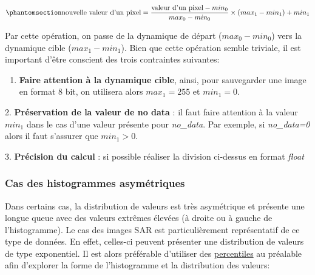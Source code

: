 \documentclass[
  11pt,
  letterpaper,
  open=any,
  twoside=false,
  french]{scrbook}
\providecommand{\tightlist}{%
  \setlength{\itemsep}{0pt}\setlength{\parskip}{0pt}}\usepackage{longtable,booktabs,array}
\begin{document}
\begin{equation}\phantomsection\label{eq-rehauss-lin}{ \text{nouvelle valeur d'un pixel} = \frac{\text{valeur d'un pixel} - min_0}{max_0 - min_0}\times (max_1 - min_1)+min_1}\end{equation}

Par cette opération, on passe de la dynamique de départ
(\(max_0 - min_0\)) vers la dynamique cible (\(max_1 - min_1\)). Bien
que cette opération semble triviale, il est important d'être conscient
des trois contraintes suivantes:

\begin{enumerate}
\def\labelenumi{\arabic{enumi}.}
\tightlist
\item
  \textbf{Faire attention à la dynamique cible}, ainsi, pour sauvegarder
  une image en format 8 bit, on utilisera alors \(max_1=255\) et
  \(min_1=0\).
\end{enumerate}

2. \textbf{Préservation de la valeur de no data} : il faut faire
attention à la valeur \(min_1\) dans le cas d'une valeur présente pour
\emph{no\_data}. Par exemple, si \emph{no\_data=0} alors il faut
s'assurer que \(min_1>0\).

3. \textbf{Précision du calcul} : si possible réaliser la division
ci-dessus en format \emph{float}

\subsubsection{Cas des histogrammes
asymétriques}\label{cas-des-histogrammes-asymuxe9triques}

Dans certains cas, la distribution de valeurs est très asymétrique et
présente une longue queue avec des valeurs extrêmes élevées (à droite ou
à gauche de l'histogramme). Le cas des images SAR est particulièrement
représentatif de ce type de données. En effet, celles-ci peuvent
présenter une distribution de valeurs de type exponentiel. Il est alors
préférable d'utiliser des
\href{https://fr.wikipedia.org/wiki/Centile}{percentiles} au préalable
afin d'explorer la forme de l'histogramme et la distribution des
valeurs:
\end{document}
